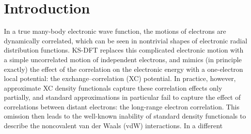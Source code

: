 \section{Introduction}

In a true many-body electronic wave function, the motions of electrons are dynamically correlated, which can be seen in nontrivial shapes of electronic radial distribution functions.
KS-DFT replaces this complicated electronic motion with a simple uncorrelated motion of independent electrons, and mimics (in principle exactly) the effect of the correlation on the electronic energy with a one-electron local potential: the exchange--correlation (XC) potential.
In practice, however, approximate XC density functionals capture these correlation effects only partially, and standard approximations in particular fail to capture the effect of correlations between distant electrons: the long-range electron correlation.
This omission then leads to the well-known inability of standard density functionals to describe the noncovalent van der Waals (vdW) interactions.
In a different 
